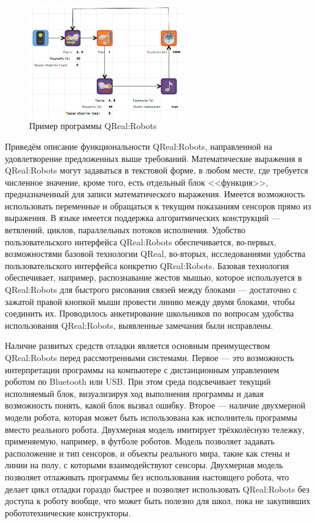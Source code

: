 \documentclass[a4paper]{article}
\begin{document}
\begin{figure} [ht]
  \begin{center}
    \includegraphics[width=0.6\textwidth]{programExample.png}
    \caption{Пример программы QReal:Robots}
    \label{programExample}
  \end{center}
\end{figure}

Приведём описание функциональности QReal:Robots, направленной на удовлетворение предложенных выше требований. Математические выражения в QReal:Robots могут задаваться в текстовой форме, в любом месте, где требуется численное значение, кроме того, есть отдельный блок <<функция>>, предназначенный для записи математического выражения. Имеется возможность использовать переменные и обращаться к текущим показаниям сенсоров прямо из выражения. В языке имеется поддержка алгоритмических конструкций --- ветвлений, циклов, параллельных потоков исполнения. Удобство пользовательского интерфейса QReal:Robots обеспечивается, во-первых, возможностями базовой технологии QReal, во-вторых, исследованиями удобства пользовательского интерфейса конкретно QReal:Robots. Базовая технология обеспечивает, например, распознавание жестов мышью, которое используется в QReal:Robots для быстрого рисования связей между блоками --- достаточно с зажатой правой кнопкой мыши провести линию между двумя блоками, чтобы соединить их. Проводилось анкетирование школьников по вопросам удобства использования QReal:Robots, выявленные замечания были исправлены.

Наличие развитых средств отладки является основным преимуществом QReal:Robots перед рассмотренными системами. Первое --- это возможность интерпретации программы на компьютере с дистанционным управлением роботом по Bluetooth или USB. При этом среда подсвечивает текущий исполняемый блок, визуализируя ход выполнения программы и давая возможность понять, какой блок вызвал ошибку. Второе --- наличие двухмерной модели робота, которая может быть использована как исполнитель программы вместо реального робота. Двухмерная модель имитирует трёхколёсную тележку, применяемую, например, в футболе роботов. Модель позволяет задавать расположение и тип сенсоров, и объекты реального мира, такие как стены и линии на полу, с которыми взаимодействуют сенсоры. Двухмерная модель позволяет отлаживать программы без использования настоящего робота, что делает цикл отладки гораздо быстрее и позволяет использовать QReal:Robots без доступа к роботу вообще, что может быть полезно для школ, пока не закупивших робототехнические конструкторы.
\end{document}
